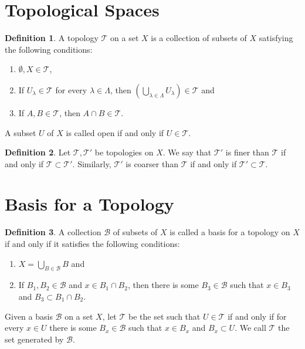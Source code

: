 \documentclass{report}
\theoremstyle{definition}
\newtheorem{definition}{Definition}[section]
\theoremstyle{remark}
\newcommand{\paren}[1]{\left( #1 \right)}
\newcommand{\prt}[1]{\mathcal{#1}}
\begin{document}
\setcounter{section}{11}
\section{Topological Spaces}


\begin{definition}\label{def_topology}
    A topology $\prt{T}$ on a set $X$ is a collection of subsets of $X$ satisfying the following conditions: 
    
    \begin{enumerate}
        \item $\emptyset, X \in \prt{T}$,
        \item If $U_\lambda \in \prt{T}$ for every $\lambda \in \Lambda$, then $\paren{\bigcup_{\lambda \in \Lambda} U_\lambda} \in \prt{T}$ and
        \item If $A, B \in \prt{T}$, then $A \cap B \in \prt{T}$.
    \end{enumerate}
    A subset $U$ of $X$ is called open if and only if $U \in \prt{T}$.
\end{definition}

\begin{definition}
    Let $\prt{T}, \prt{T'}$ be topologies on $X$. We say that $\prt{T'}$ is finer than $\prt{T}$ if and only if $\prt{T} \subset \prt{T'}$. Similarly, $\prt{T'}$ is coarser than $\prt{T}$ if and only if $\prt{T'} \subset \prt{T}$. 
\end{definition}

\section{Basis for a Topology}

\begin{definition}\label{def_basis}
    A collection $\prt{B}$ of subsets of $X$ is called a basis for a topology on $X$ if and only if it satisfies the following conditions:
    \begin{enumerate}
        \item $X = \bigcup_{B \in \prt{B}} B$ and
        \item If $B_1, B_2 \in \prt{B}$ and $x \in B_1 \cap B_2$, then there is some $B_3 \in \prt{B}$ such that $x \in B_3$ and $B_3 \subset B_1 \cap B_2$.
    \end{enumerate}
    Given a basis $\prt{B}$ on a set $X$, let $\prt{T}$ be the set such that $U \in \prt{T}$ if and only if for every $x \in U$ there is some $B_x \in \prt{B}$ such that $x \in B_x$ and $B_x \subset U$. We call $\prt{T}$ the set generated by $\prt{B}$.
\end{definition}
\end{document}
